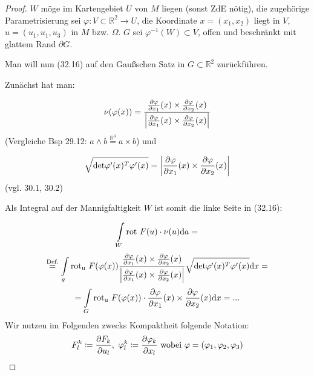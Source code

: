 \begin{proof}

$W$ möge im Kartengebiet $U$ von $M$ liegen (sonst ZdE nötig),
die zugehörige Parametrisierung sei $\varphi: V \subset \mathbb{R}^2 \rightarrow U $,
die Koordinate $x = (x_1, x_2) $ liegt in $V$, 
$u = (u_1, u_1, u_3) $ in $M$ bzw. $\Omega$.
$G$ sei $\varphi^{-1} (W) \subset V $, offen und beschränkt mit glattem Rand $\partial G $.

Man will nun (32.16) auf den Gaußschen Satz in $G \subset \mathbb{R}^2 $ zurückführen.

Zunächst hat man:

\begin{equation*}
\nu(\varphi(x)) = 
\frac
    {\frac{\partial{\varphi}}{\partial{x_1}} (x) \times \frac{\partial{\varphi}}{\partial{x_2}} (x)}
    {\left| \frac{\partial{\varphi}}{\partial{x_1}} (x) \times \frac{\partial{\varphi}}{\partial{x_2}} (x) \right|}
\end{equation*}
(Vergleiche Bsp 29.12: $a \wedge b \stackrel{\mathbb{R}^3}{=} a \times b $) und

\begin{equation*}
\sqrt{\mathrm{det } \varphi'(x)^T \varphi'(x)}
=
\left| \frac{\partial{\varphi}}{\partial{x_1}} (x) \times \frac{\partial{\varphi}}{\partial{x_2}} (x) \right| 
\end{equation*}
(vgl. 30.1, 30.2)

Als Integral auf der Mannigfaltigkeit $W$ ist somit die linke Seite in (32.16):

\begin{equation*}
\int\limits_W \mathrm{rot\ } F(u) \cdot \nu(u) \mathrm{d}a =
\end{equation*}
\begin{equation*}
\stackrel{\text{Def.}}{=}
\int\limits_g \mathrm{rot_u } \ F(\varphi(x)) 
\frac
    {\frac{\partial{\varphi}}{\partial{x_1}} (x) \times \frac{\partial{\varphi}}{\partial{x_2}} (x)}
    {\left| \frac{\partial{\varphi}}{\partial{x_1}} (x) \times \frac{\partial{\varphi}}{\partial{x_2}} (x) \right|}
\sqrt{\mathrm{det } \varphi'(x)^T \varphi'(x)}
\mathrm{d}x =
\end{equation*}
\begin{equation*}
=
\int\limits_G \mathrm{rot_u } \ F(\varphi(x)) \cdot 
\frac{\partial{\varphi}}{\partial{x_1}} (x) \times \frac{\partial{\varphi}}{\partial{x_2}} (x)
\mathrm{d}x = ...
\end{equation*}
\leftskip=30pt Wir nutzen im Folgenden zwecks Kompaktheit folgende Notation:\\
\begin{equation*}
F_l^k \coloneqq \frac{\partial{F_k}}{\partial{u_l}},\
\varphi_l^k \coloneqq \frac{\partial{\varphi_k}}{\partial{x_l}} \ \mathrm{wobei\ }\varphi = (\varphi_1, \varphi_2, \varphi_3)
\end{equation*}


\end{proof}
